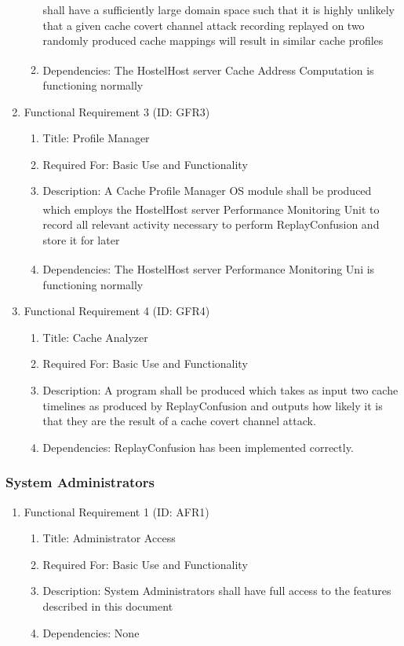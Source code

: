 \documentclass[12pt]{article}
\begin{document}
\begin{enumerate}
\begin{enumerate}
        shall have a sufficiently large domain space such that it is highly unlikely that a given cache covert channel
        attack recording replayed on two randomly produced cache mappings will result in similar cache profiles
        \item Dependencies: The HostelHost\textsuperscript{\tiny\textregistered} server Cache Address Computation is
        functioning normally
    \end{enumerate}
    \item Functional Requirement 3 (ID: GFR3)
    \begin{enumerate}
        \item Title: Profile Manager
        \item Required For: Basic Use and Functionality
        \item Description: A Cache Profile Manager OS module shall be produced which employs the
        HostelHost\textsuperscript{\tiny\textregistered} server Performance Monitoring Unit to record all relevant
        activity necessary to perform ReplayConfusion and store it for later
        \item Dependencies: The HostelHost\textsuperscript{\tiny\textregistered} server Performance Monitoring Uni
        is functioning normally
    \end{enumerate}
    \item Functional Requirement 4 (ID: GFR4)
    \begin{enumerate}
        \item Title: Cache Analyzer
        \item Required For: Basic Use and Functionality
        \item Description:  A program shall be produced which takes as input two cache timelines as produced
        by ReplayConfusion and outputs how likely it is that they are the result of a cache covert channel attack.
        \item Dependencies: ReplayConfusion has been implemented correctly.
    \end{enumerate}
\end{enumerate}

\subsubsection{System Administrators}

\begin{enumerate}
    \item Functional Requirement 1 (ID: AFR1)
    \begin{enumerate}
        \item Title: Administrator Access
        \item Required For: Basic Use and Functionality
        \item Description: System Administrators shall have full access to the features described in this document
        \item Dependencies: None
    \end{enumerate}
\end{enumerate}
\end{document}
